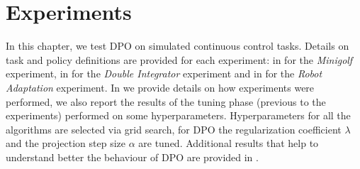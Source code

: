 \chapter{Experiments} \label{chap:exp}
In this chapter, we test \ac{DPO} on simulated continuous control tasks. Details on task and policy definitions are provided for each experiment: in  for the \emph{Minigolf} experiment, in  for the \emph{Double Integrator} experiment and in  for the \emph{Robot Adaptation} experiment. In  we provide details on how experiments were performed, we also report the results of the tuning phase (previous to the experiments) performed on some hyperparameters. Hyperparameters for all the algorithms are selected via grid search, for \ac{DPO} the regularization coefficient $\lambda$ and the projection step size $\alpha$ are tuned. Additional results that help to understand better the behaviour of \ac{DPO} are provided in .

